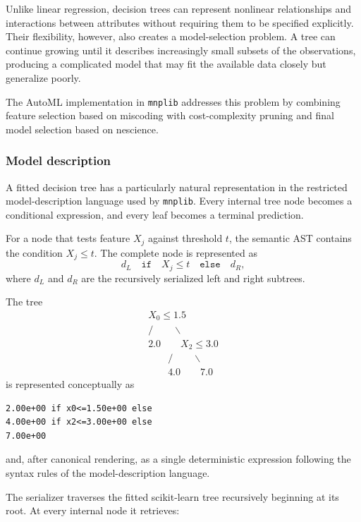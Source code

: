 Unlike linear regression, decision trees can represent nonlinear relationships and interactions between attributes without requiring them to be specified explicitly. Their flexibility, however, also creates a model-selection problem. A tree can continue growing until it describes increasingly small subsets of the observations, producing a complicated model that may fit the available data closely but generalize poorly.

The AutoML implementation in \texttt{mnplib} addresses this problem by combining feature selection based on miscoding with cost-complexity pruning and final model selection based on nescience.

\subsubsection{Model description}

A fitted decision tree has a particularly natural representation in the restricted model-description language used by \texttt{mnplib}. Every internal tree node becomes a conditional expression, and every leaf becomes a terminal prediction.

For a node that tests feature \(X_j\) against threshold \(t\), the semantic AST contains the condition $X_j\leq t$. The complete node is represented as
\[
d_L \quad \texttt{if} \quad X_j\leq t \quad \texttt{else} \quad d_R,
\]
where $d_L$ and $d_R$ are the recursively serialized left and right subtrees.

\begin{example}
The tree
\[
\begin{array}{c}
X_0\leq1.5 \\
/\qquad\backslash \\
2.0 \qquad X_2\leq3.0 \\
\qquad / \qquad\backslash \\
\qquad 4.0 \qquad 7.0
\end{array}
\]
is represented conceptually as
\begin{verbatim}
2.00e+00 if x0<=1.50e+00 else
4.00e+00 if x2<=3.00e+00 else
7.00e+00
\end{verbatim}
and, after canonical rendering, as a single deterministic expression following the syntax rules of the model-description language.
\end{example}

The serializer traverses the fitted scikit-learn tree recursively beginning at its root. At every internal node it retrieves:


